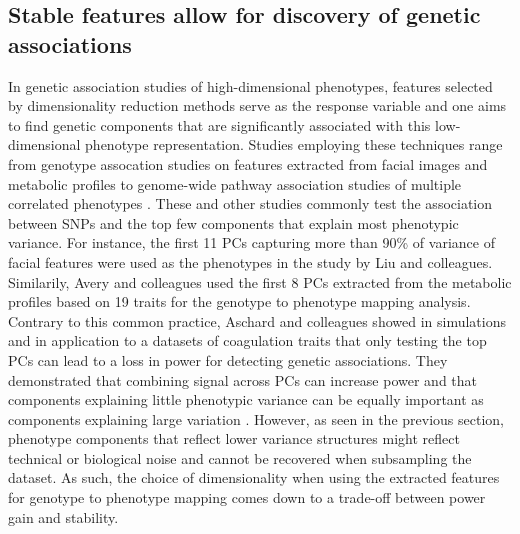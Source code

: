 \subsection{Stable features allow for discovery of genetic associations}
\label{subsection:association-DimRed}
In genetic association studies of high-dimensional phenotypes, features selected by dimensionality reduction methods serve as the response variable and one aims to find genetic components that are significantly associated with this low-dimensional phenotype representation. Studies employing these techniques range from genotype assocation studies on features extracted from facial images \citep{Liu2012} and metabolic profiles \citep{Avery2011} to genome-wide pathway association studies of multiple correlated phenotypes \citep{Zhang2012}. These and other studies \citep{} commonly test the association between SNPs and the top few components that explain most phenotypic variance. For instance,  the first \num{11} PCs capturing more than \num{90}\% of variance of facial features were used as the phenotypes in the study by Liu and colleagues. Similarily, Avery and colleagues used the first \num{8} PCs extracted from the metabolic profiles based on \num{19} traits for the genotype to phenotype mapping analysis. Contrary to this common practice, Aschard and colleagues showed in simulations and in application to a datasets of coagulation traits that only testing the top PCs can lead to a loss in power for detecting genetic associations. They demonstrated that combining signal across PCs can increase power and that components explaining little phenotypic variance can be equally important as components explaining large variation \citep{Aschard2104}. However, as seen in the previous section, phenotype components that reflect lower variance structures might reflect technical or biological noise and cannot be recovered when subsampling the dataset. As such, the choice of dimensionality when using the extracted features for genotype to phenotype mapping comes down to a trade-off between power gain and stability.


